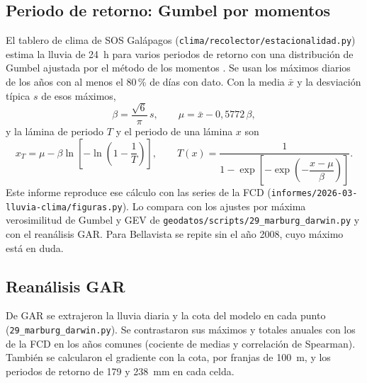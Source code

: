\documentclass{sosg-informe}
\begin{document}
\subsection{Periodo de retorno: Gumbel por momentos}\label{sec:gumbel}
El tablero de clima de SOS Galápagos (\texttt{clima/recolector/estacionalidad.py}) estima la lluvia de 24~h para varios periodos de retorno con una distribución de Gumbel \citep{gumbel1958} ajustada por el método de los momentos \citep{chow1988}. Se usan los máximos diarios de los años con al menos el 80\,\% de días con dato. Con la media $\bar{x}$ y la desviación típica $s$ de esos máximos,
\begin{equation}
  \beta = \frac{\sqrt{6}}{\pi}\, s, \qquad \mu = \bar{x} - 0{,}5772\,\beta ,
\end{equation}
y la lámina de periodo $T$ y el periodo de una lámina $x$ son
\begin{equation}
  x_T = \mu - \beta \ln\!\left[-\ln\!\left(1 - \frac{1}{T}\right)\right], \qquad
  T(x) = \frac{1}{1 - \exp\!\left[-\exp\!\left(-\dfrac{x-\mu}{\beta}\right)\right]} .
  \label{eq:gumbel}
\end{equation}
Este informe reproduce ese cálculo con las series de la FCD (\texttt{informes/2026-03-lluvia-clima/figuras.py}). Lo compara con los ajustes por máxima verosimilitud de Gumbel y GEV \citep{coles2001} de \texttt{geodatos/scripts/29\_marburg\_darwin.py} y con el reanálisis GAR. Para Bellavista se repite sin el año 2008, cuyo máximo está en duda.

\subsection{Reanálisis GAR}
De GAR se extrajeron la lluvia diaria y la cota del modelo en cada punto (\texttt{29\_marburg\_darwin.py}). Se contrastaron sus máximos y totales anuales con los de la FCD en los años comunes (cociente de medias y correlación de Spearman). También se calcularon el gradiente con la cota, por franjas de 100~m, y los periodos de retorno de 179 y 238~mm en cada celda.
\end{document}
